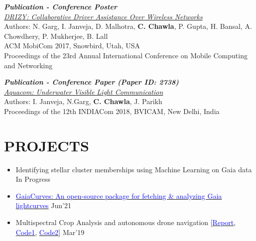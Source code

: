 \documentclass[11pt]{res} %
\begin{document}
\begin{resume}
\textbf{\textit{Publication - Conference Poster}}\\ \textcolor{blue}{\textit{\href{https://dl.acm.org/doi/10.1145/3117811.3131255}{DRIZY: Collaborative Driver Assistance Over Wireless Networks}}} \\
Authors: N. Garg, I. Janveja, D. Malhotra, \textbf{C. Chawla}, P. Gupta, H. Bansal, A. Chowdhery, P. Mukherjee, B. Lall\\
ACM MobiCom 2017, Snowbird, Utah, USA
\\Proceedings of the 23rd Annual International Conference on Mobile Computing and Networking

\textbf{\textit{Publication - Conference Paper (Paper ID: 2738)}}\\ \textcolor{blue}{\textit{\href{http://bvicam.in/INDIACom/news/INDIACom\%202018\%20Proceedings/Main/papers.html}{Aquacom: Underwater Visible Light Communication}}}\\
Authors: I. Janveja, N.Garg, \textbf{C. Chawla}, J. Parikh\\
Proceedings of the 12th INDIACom 2018, BVICAM, New Delhi, India

\vspace{0.1in} 
\hline



\section{PROJECTS}
\vspace{0.25in}
\begin{itemize}
    
    \item Identifying stellar cluster memberships using Machine Learning on Gaia data \hfill In Progress
    
    \item
    \href{https://github.com/sonithls/GaiaCurves}{\textcolor{blue}{GaiaCurves: An open-source package for fetching \& analyzing Gaia lightcurves}} \hfill Jun'21
    
    \item 
    Multispectral Crop Analysis and autonomous drone navigation [\href{https://drive.google.com/file/d/1_sTauKcEWi5l1tRGF1SYRc_7a13DjSDE/view}{\textcolor{blue}{Report}}, \href{https://github.com/chetanchawla/Dronalyser}{\textcolor{blue}{Code1}}, \href{https://github.com/chetanchawla/eYantra2018-HB}{\textcolor{blue}{Code2}}] \hfill Mar'19
    

\end{itemize}
\end{resume}
\end{document}
